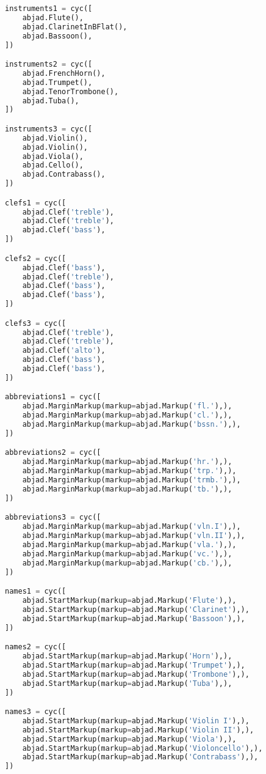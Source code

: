\begin{lstlisting}[language=Python, caption=Tianshu Segment\_I]
instruments1 = cyc([
    abjad.Flute(),
    abjad.ClarinetInBFlat(),
    abjad.Bassoon(),
])

instruments2 = cyc([
    abjad.FrenchHorn(),
    abjad.Trumpet(),
    abjad.TenorTrombone(),
    abjad.Tuba(),
])

instruments3 = cyc([
    abjad.Violin(),
    abjad.Violin(),
    abjad.Viola(),
    abjad.Cello(),
    abjad.Contrabass(),
])

clefs1 = cyc([
    abjad.Clef('treble'),
    abjad.Clef('treble'),
    abjad.Clef('bass'),
])

clefs2 = cyc([
    abjad.Clef('bass'),
    abjad.Clef('treble'),
    abjad.Clef('bass'),
    abjad.Clef('bass'),
])

clefs3 = cyc([
    abjad.Clef('treble'),
    abjad.Clef('treble'),
    abjad.Clef('alto'),
    abjad.Clef('bass'),
    abjad.Clef('bass'),
])

abbreviations1 = cyc([
    abjad.MarginMarkup(markup=abjad.Markup('fl.'),),
    abjad.MarginMarkup(markup=abjad.Markup('cl.'),),
    abjad.MarginMarkup(markup=abjad.Markup('bssn.'),),
])

abbreviations2 = cyc([
    abjad.MarginMarkup(markup=abjad.Markup('hr.'),),
    abjad.MarginMarkup(markup=abjad.Markup('trp.'),),
    abjad.MarginMarkup(markup=abjad.Markup('trmb.'),),
    abjad.MarginMarkup(markup=abjad.Markup('tb.'),),
])

abbreviations3 = cyc([
    abjad.MarginMarkup(markup=abjad.Markup('vln.I'),),
    abjad.MarginMarkup(markup=abjad.Markup('vln.II'),),
    abjad.MarginMarkup(markup=abjad.Markup('vla.'),),
    abjad.MarginMarkup(markup=abjad.Markup('vc.'),),
    abjad.MarginMarkup(markup=abjad.Markup('cb.'),),
])

names1 = cyc([
    abjad.StartMarkup(markup=abjad.Markup('Flute'),),
    abjad.StartMarkup(markup=abjad.Markup('Clarinet'),),
    abjad.StartMarkup(markup=abjad.Markup('Bassoon'),),
])

names2 = cyc([
    abjad.StartMarkup(markup=abjad.Markup('Horn'),),
    abjad.StartMarkup(markup=abjad.Markup('Trumpet'),),
    abjad.StartMarkup(markup=abjad.Markup('Trombone'),),
    abjad.StartMarkup(markup=abjad.Markup('Tuba'),),
])

names3 = cyc([
    abjad.StartMarkup(markup=abjad.Markup('Violin I'),),
    abjad.StartMarkup(markup=abjad.Markup('Violin II'),),
    abjad.StartMarkup(markup=abjad.Markup('Viola'),),
    abjad.StartMarkup(markup=abjad.Markup('Violoncello'),),
    abjad.StartMarkup(markup=abjad.Markup('Contrabass'),),
])


\end{lstlisting}
